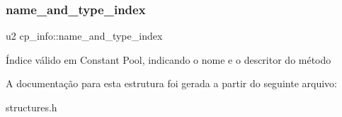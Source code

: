 \subsubsection{\texorpdfstring{name\+\_\+and\+\_\+type\+\_\+index}{name\_and\_type\_index}}
{\footnotesize\ttfamily u2 cp\+\_\+info\+::name\+\_\+and\+\_\+type\+\_\+index}

Índice válido em Constant Pool, indicando o nome e o descritor do método 

A documentação para esta estrutura foi gerada a partir do seguinte arquivo\+:\begin{DoxyCompactItemize}
\item 
structures.\+h\end{DoxyCompactItemize}
